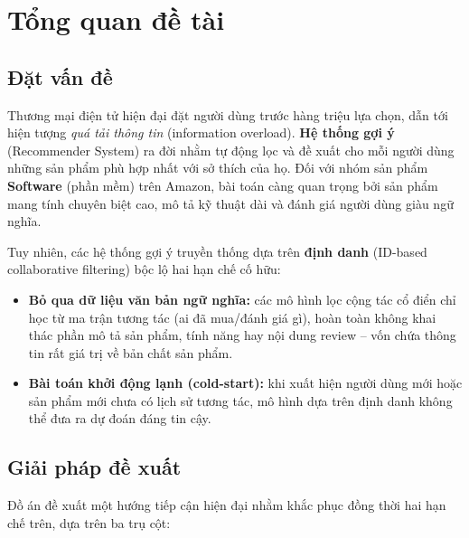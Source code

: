 \chapter{Tổng quan đề tài}
\label{chap:intro}

\section{Đặt vấn đề}

Thương mại điện tử hiện đại đặt người dùng trước hàng triệu lựa chọn, dẫn tới hiện
tượng \textit{quá tải thông tin} (information overload). \textbf{Hệ thống gợi ý}
(Recommender System) ra đời nhằm tự động lọc và đề xuất cho mỗi người dùng những sản
phẩm phù hợp nhất với sở thích của họ. Đối với nhóm sản phẩm \textbf{Software} (phần
mềm) trên Amazon, bài toán càng quan trọng bởi sản phẩm mang tính chuyên biệt cao,
mô tả kỹ thuật dài và đánh giá người dùng giàu ngữ nghĩa.

Tuy nhiên, các hệ thống gợi ý truyền thống dựa trên \textbf{định danh} (ID-based
collaborative filtering) bộc lộ hai hạn chế cố hữu:

\begin{itemize}[leftmargin=2em, itemsep=2pt]
    \item \textbf{Bỏ qua dữ liệu văn bản ngữ nghĩa:} các mô hình lọc cộng tác cổ
    điển chỉ học từ ma trận tương tác (ai đã mua/đánh giá gì), hoàn toàn không khai
    thác phần mô tả sản phẩm, tính năng hay nội dung review -- vốn chứa thông tin
    rất giá trị về bản chất sản phẩm.
    \item \textbf{Bài toán khởi động lạnh (cold-start):} khi xuất hiện người dùng
    mới hoặc sản phẩm mới chưa có lịch sử tương tác, mô hình dựa trên định danh không
    thể đưa ra dự đoán đáng tin cậy.
\end{itemize}

\section{Giải pháp đề xuất}

Đồ án đề xuất một hướng tiếp cận hiện đại nhằm khắc phục đồng thời hai hạn chế trên,
dựa trên ba trụ cột:

